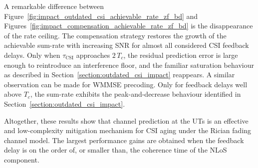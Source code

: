 A remarkable difference between Figure~\ref{fig:impact_outdated_csi_achievable_rate_zf_bd} and Figures~\ref{fig:impact_compensation_achievable_rate_zf_bd} is the disappearance of the rate ceiling.
The compensation strategy restores the growth of the achievable sum-rate with increasing \ac{SNR} for almost all considered \ac{CSI} feedback delays.
Only when $\tau_{\mathrm{CSI}}$ approaches $2\,T_c$, the residual prediction error is large enough to reintroduce an interference floor, and the familiar saturation behaviour as described in Section~\ref{section:outdated_csi_impact} reappears.
A similar observation can be made for \ac{WMMSE} precoding.
Only for feedback delays well above $T_c$, the sum-rate exhibits the peak-and-decrease behaviour identified in Section~\ref{section:outdated_csi_impact}.

Altogether, these results show that channel prediction at the \acp{UT} is an effective and low-complexity mitigation mechanism for \ac{CSI} aging under the Rician fading channel model.
The largest performance gains are obtained when the feedback delay is on the order of, or smaller than, the coherence time of the \ac{NLoS} component.

